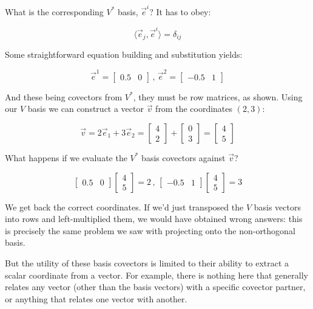 What is the corresponding $V^*$ basis, $\vec{e}^i$? It has to obey:

$$
\langle \vec{e}_j,\vec{e}^i \rangle = \delta_{ij}
$$

Some straightforward equation building and substitution yields:

$$
\vec{e}^1 = \begin{bmatrix}0.5 & 0\end{bmatrix}\,,\,
\vec{e}^2 = \begin{bmatrix}-0.5 & 1\end{bmatrix}
$$

And these being covectors from $V^*$, they must be row matrices, as shown. Using our $V$ basis we can construct a vector $\vec{v}$ from the coordinates $(2, 3)$:

$$
\vec{v} = 2\vec{e}_1 + 3\vec{e}_2
        = \begin{bmatrix}4 \\ 2\end{bmatrix} + \begin{bmatrix}0 \\ 3\end{bmatrix} 
        = \begin{bmatrix}4 \\ 5\end{bmatrix}
$$

What happens if we evaluate the $V^*$ basis covectors against $\vec{v}$?

$$
\begin{bmatrix}0.5 & 0\end{bmatrix} \begin{bmatrix}4 \\ 5\end{bmatrix} = 2 
\,,\,
\begin{bmatrix}-0.5 & 1\end{bmatrix} \begin{bmatrix}4 \\ 5\end{bmatrix} = 3
$$

We get back the correct coordinates. If we'd just transposed the $V$ basis vectors into rows and left-multiplied them, we would have obtained wrong answers: this is precisely the same problem we saw with projecting onto the non-orthogonal basis.

But the utility of these basis covectors is limited to their ability to extract a scalar coordinate from a vector. For example, there is nothing here that generally relates any vector (other than the basis vectors) with a specific covector partner, or anything that relates one vector with another.

